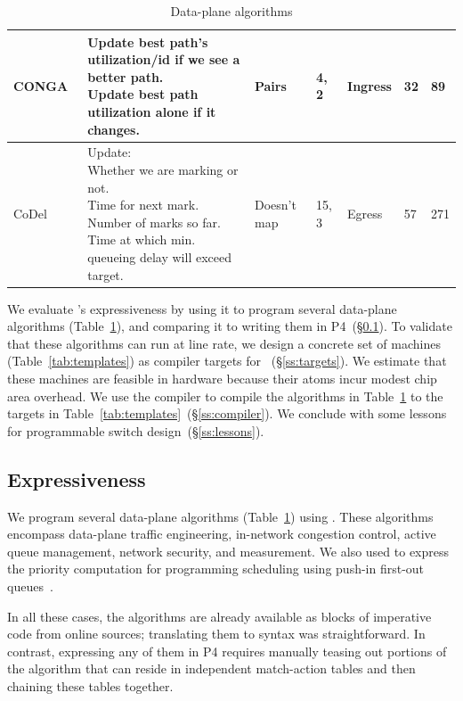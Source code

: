 \begin{table}[!t]
\begin{tabular}{|p{}|p{}|p{}|p{}|p{}|p{}|p{}|}
\hline
CONGA~\cite{conga} & \pbox{0.34\textwidth}{Update best path's utilization/id if we see a better path.\\
                                           Update best path utilization alone if it changes.}  & Pairs & 4, 2 & Ingress & 32 & 89\\
\hline
CoDel~\cite{codel} & \pbox{0.34\textwidth}{Update:\\Whether we are marking or not.\\Time for next mark.\\Number of marks so far.\\Time at which min. queueing delay will exceed target.}& Doesn't map & 15, 3 & Egress & 57 & 271\\
\hline
\end{tabular}
\caption{Data-plane algorithms}
\label{tab:algos}
\end{table}

We evaluate \pktlanguage's expressiveness by using it to program several
data-plane algorithms (Table~\ref{tab:algos}), and comparing it to writing them
in P4~(\S\ref{ss:expressiveness}).  To validate that these algorithms can
run at line rate, we design a concrete set of \absmachine machines
(Table~\ref{tab:templates}) as compiler targets for
\pktlanguage~(\S\ref{ss:targets}).  We estimate that these machines are
feasible in hardware because their atoms incur modest chip area overhead.
We use the \pktlanguage compiler to compile the algorithms in
Table~\ref{tab:algos} to the targets in
Table~\ref{tab:templates}~(\S\ref{ss:compiler}).  We conclude with some lessons
for programmable switch design~(\S\ref{ss:lessons}).

\subsection{Expressiveness}
\label{ss:expressiveness}

We program several data-plane
algorithms (Table~\ref{tab:algos}) using \pktlanguage. These algorithms
encompass data-plane traffic engineering, in-network congestion control, active
queue management, network security, and measurement. We also used \pktlanguage
to express the priority computation for programming scheduling using
push-in first-out queues~\cite{pifo_sigcomm}.

In all these cases, the algorithms are already available as blocks of
imperative code from online sources; translating them to \pktlanguage syntax
was straightforward. In contrast, expressing any of them in P4 requires
manually teasing out portions of the algorithm that can reside in independent
match-action tables and then chaining these tables together.

